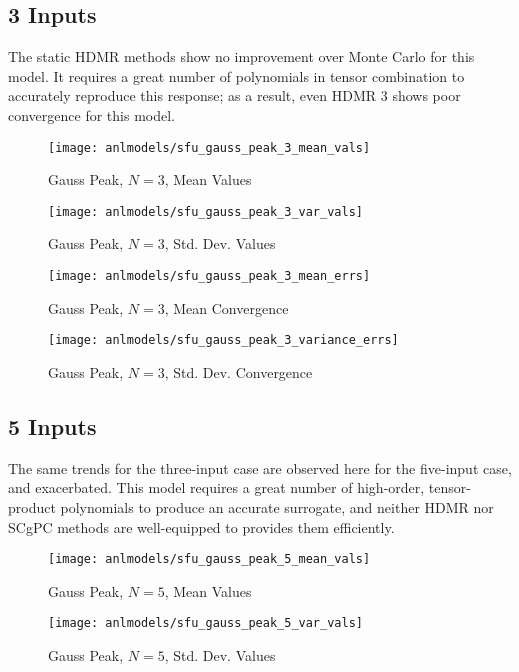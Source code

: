 \subsection{3 Inputs}
The static HDMR methods show no improvement over Monte Carlo for this model.  It
requires a great number of polynomials in tensor combination to accurately reproduce this response; as a
result, even HDMR 3 shows poor convergence for this model.
\begin{figure}[H]
  \centering
  \texttt{[image: anlmodels/sfu\_gauss\_peak\_3\_mean\_vals]}
  \caption{Gauss Peak, $N=3$, Mean Values}
  \label{fig:hdmr gauss peak mean values 3}
\end{figure}
\begin{figure}[H]
  \centering
  \texttt{[image: anlmodels/sfu\_gauss\_peak\_3\_var\_vals]}
  \caption{Gauss Peak, $N=3$, Std. Dev. Values}
  \label{fig:hdmr gauss peak var values 3}
\end{figure}

\begin{figure}[H]
  \centering
  \texttt{[image: anlmodels/sfu\_gauss\_peak\_3\_mean\_errs]}
  \caption{Gauss Peak, $N=3$, Mean Convergence}
  \label{fig:hdmr gauss peak mean errors 3}
\end{figure}
\begin{figure}[H]
  \centering
  \texttt{[image: anlmodels/sfu\_gauss\_peak\_3\_variance\_errs]}
  \caption{Gauss Peak, $N=3$, Std. Dev. Convergence}
  \label{fig:hdmr gauss peak var errors 3}
\end{figure}

\subsection{5 Inputs}
The same trends for the three-input case are observed here for the five-input case, and exacerbated.  This
model requires a great number of high-order, tensor-product polynomials to produce an accurate surrogate, and
neither HDMR nor SCgPC methods are well-equipped to provides them efficiently.
\begin{figure}[H]
  \centering
  \texttt{[image: anlmodels/sfu\_gauss\_peak\_5\_mean\_vals]}
  \caption{Gauss Peak, $N=5$, Mean Values}
  \label{fig:hdmr gauss peak mean values 5}
\end{figure}
\begin{figure}[H]
  \centering
  \texttt{[image: anlmodels/sfu\_gauss\_peak\_5\_var\_vals]}
  \caption{Gauss Peak, $N=5$, Std. Dev. Values}
  \label{fig:hdmr gauss peak var values 5}
\end{figure}

